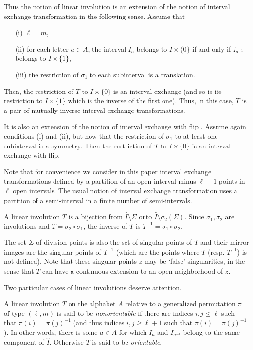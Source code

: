 \documentclass[preprint,12pt]{elsarticle}
\numberwithin{theorem}{section}
\numberwithin{equation}{section}
\numberwithin{figure}{section}
\numberwithin{table}{section}
\begin{document}
Thus the notion of linear involution is an extension of the notion 
of  interval exchange transformation in the following sense.
Assume that 
\begin{enumerate}
\item[(i)] $\ell=m$, 
\item[(ii)] for each letter $a\in A$, the interval
$I_a$ belongs to $I\times\{0\}$ if and only if $I_{a^{-1}}$ belongs
to $I\times\{1\}$,  
\item[(iii)] the restriction of $\sigma_1$
to each subinterval is a translation. 
\end{enumerate}
Then, the restriction of $T$
to $I\times \{0\}$ is an interval exchange (and so is its restriction to 
$I\times \{1\}$ which is the inverse of the first one). Thus,
in this case, $T$ is a pair of mutually inverse interval exchange transformations.

It is also an extension of the notion of interval exchange with flip
\cite{Nogueira1989,NogueiraPiresTroubetzkoy2013}. Assume again  conditions (i)
and (ii), but now that the restriction of $\sigma_1$
to at least one  subinterval is a symmetry. Then the restriction of $T$
to $I\times \{0\}$ is an interval exchange  with flip.


Note that for convenience we consider in this paper interval exchange transformations
defined by a partition of an open interval  minus
$\ell-1$ points in $\ell$
 open intervals. The usual notion of interval exchange transformation
uses a partition of a semi-interval in a finite number of semi-intervals.


A linear involution $T$ is a bijection from $\hat{I}\setminus\Sigma$
onto $\hat{I}\setminus\sigma_2(\Sigma)$.
Since $\sigma_1,\sigma_2$ are involutions and $T=\sigma_2\circ\sigma_1$,
 the inverse of $T$
is $T^{-1}=\sigma_1\circ\sigma_2$.

The set $\Sigma$ of division points is also the set of singular points
of $T$ and their mirror images are the singular points of $T^{-1}$
(which are the points where $T$ (resp. $T^{-1}$) is not defined).
Note that these singular points $z$ may be `false' singularities, in the sense
that $T$ can have a continuous extension to an open neighborhood of $z$.



Two particular cases of linear involutions deserve attention.

A linear involution $T$ on the alphabet $A$ 
relative to a generalized permutation $\pi$ of type
$(\ell,m)$ 
is said to be \emph{nonorientable} if there are indices $i,j\le \ell$ such that
$\pi(i)=\pi(j)^{-1}$  (and thus indices $i,j\ge \ell+1$
such that $\pi(i)=\pi(j)^{-1}$).  In other words,  there is  some $a\in A$ for which  $I_a$
and $I_{a^{-1}}$ belong to  the same component  of $\hat{I}$. Otherwise
$T$ is said to be \emph{orientable}.  
\end{document}
